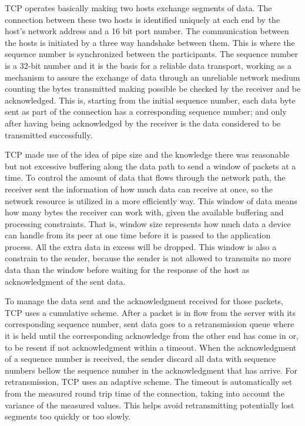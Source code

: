 TCP operates basically making two hosts exchange segments of data. The
connection between these two hosts is identified uniquely at each end by the
host's network address and a 16 bit port number. The communication between the
hosts is initiated by a three way handshake between them. This is where the
sequence number is synchronized between the participants. The sequence number
is a 32-bit number and it is the basis for a reliable data transport, working as
a mechanism to assure the exchange of data through an unreliable network
medium counting the bytes transmitted making possible be checked by the
receiver and be acknowledged. This is, starting from the initial sequence
number, each data byte sent as part of the connection has a corresponding
sequence number; and only after having being acknowledged by the receiver is
the data considered to be transmitted successfully.

TCP made use of the idea of pipe size and the knowledge there was reasonable
but not excessive buffering along the data path to send a window of packets at
a time. To control the amount of data that flows through the network path, the
receiver sent the information of how much data can receive at once, so the
network resource is utilized in a more efficiently way. This window of data
means how many bytes the receiver can work with, given the available buffering
and processing constraints. That is, window size represents how much data a
device can handle from its peer at one time before it is passed to the
application process. All the extra data in excess will be dropped. This window
is also a constrain to the sender, because the sender is not allowed to
transmits no more data than the window before waiting for the response of the
host as acknowledgment of the sent data.

To manage the data sent and the acknowledgment received for those packets, TCP
uses a cumulative scheme. After a packet is in flow from the server with its
corresponding sequence number, sent data goes to a retransmission queue where
it is held until the corresponding acknowledge from the other end has come in
or, to be resent if not acknowledgment within a timeout. When the
acknowledgment of a sequence number is received, the sender discard all data
with sequence numbers bellow the sequence number in the acknowledgment that
has arrive. For retransmission, TCP uses an adaptive scheme. The timeout is
automatically set from the measured round trip time of the connection,
taking into account the variance of the measured values\cite{JacobsonCAC}.
This helps avoid retransmitting potentially lost segments too quickly or too
slowly.

